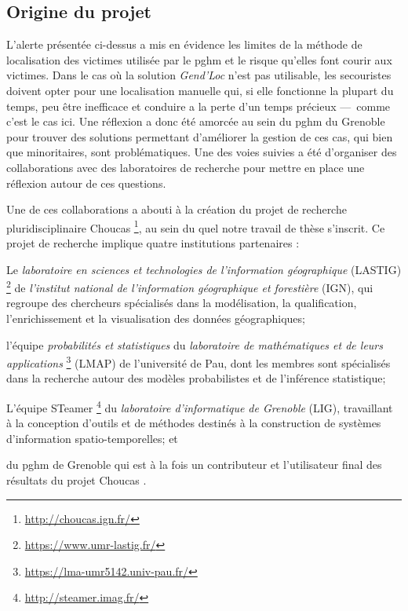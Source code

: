 \subsection{Origine du projet}
\label{subsec:1-2-1}

L’alerte présentée ci-dessus a mis en évidence les limites de la
méthode de localisation des victimes utilisée par le \ac{pghm} et le
risque qu'elles font courir aux victimes. Dans le cas où la solution
\emph{Gend'Loc} n'est pas utilisable, les secouristes doivent opter
pour une localisation manuelle qui, si elle fonctionne la plupart du
temps, peu être inefficace et conduire a la perte d'un temps précieux
---~comme c'est le cas ici. Une réflexion a donc été amorcée au sein
du \ac{pghm} du Grenoble pour trouver des solutions permettant
d'améliorer la gestion de ces cas, qui bien que minoritaires, sont
problématiques. Une des voies suivies a été d'organiser des
collaborations avec des laboratoires de recherche pour mettre en place
une réflexion autour de ces questions.

Une de ces collaborations a abouti à la création du projet de
recherche pluridisciplinaire Choucas
\footnote{\url{http://choucas.ign.fr/}}, au sein du quel notre travail
de thèse s'inscrit. Ce projet de recherche implique quatre
institutions partenaires :
%
\begin{enumerate*}[label=(\arabic*)]
\item Le \emph{laboratoire en sciences et technologies de
    l'information géographique} (LASTIG)
  \footnote{\url{https://www.umr-lastig.fr/}} de \emph{l'institut
    national de l'information géographique et forestière} (IGN), qui
  regroupe des chercheurs spécialisés dans la modélisation, la
  qualification, l'enrichissement et la visualisation des données
  géographiques;
\item l'équipe \emph{probabilités et statistiques} du
  \emph{laboratoire de mathématiques et de leurs applications}
  \footnote{\url{https://lma-umr5142.univ-pau.fr/}} (LMAP) de
  l'université de Pau, dont les membres sont spécialisés dans la
  recherche autour des modèles probabilistes et de l'inférence
  statistique;
\item L'équipe STeamer \footnote{\url{http://steamer.imag.fr/}} du
  \emph{laboratoire d'informatique de Grenoble} (LIG), travaillant à
  la conception d'outils et de méthodes destinés à la construction de
  systèmes d'information spatio-temporelles; et
\item du \ac{pghm} de Grenoble qui est à la fois un contributeur et
  l'utilisateur final des résultats du projet Choucas
  \autocite{Choucas2020}.
\end{enumerate*}

